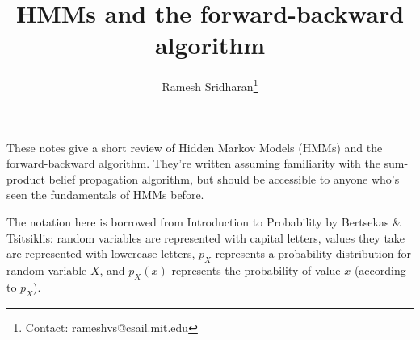 \documentclass[12pt]{article}
\title{HMMs and the forward-backward algorithm}
\author{Ramesh Sridharan\thanks{Contact: \mbox{rameshvs@csail.mit.edu}}}
\date{}
\begin{document}
    \maketitle
    These notes give a short review of Hidden Markov Models (HMMs) and the
    forward-backward algorithm. They're written assuming familiarity with
    the sum-product belief propagation algorithm, but should be accessible
    to anyone who's seen the fundamentals of HMMs before.

    The notation here is borrowed from Introduction to Probability by Bertsekas \& Tsitsiklis: random variables are represented with capital letters, values they take are
    represented with lowercase letters, 
    $p_X$ represents a probability distribution for random variable $X$, and $p_X(x)$
    represents the probability of value $x$ (according to $p_X$).
\end{document}
